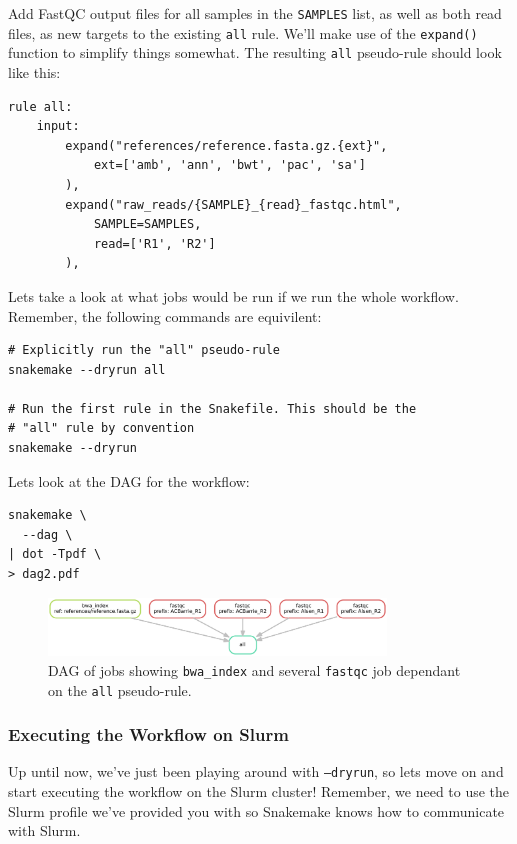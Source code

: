 Add FastQC output files for all samples in the \texttt{SAMPLES} list, as well as both read files, as new targets to the existing \texttt{all} rule. We'll make use of the \texttt{expand()}
function to simplify things somewhat. The resulting \texttt{all} pseudo-rule should look like this:

\begin{lstlisting}
rule all:
	input:
		expand("references/reference.fasta.gz.{ext}",
			ext=['amb', 'ann', 'bwt', 'pac', 'sa']
		),
		expand("raw_reads/{SAMPLE}_{read}_fastqc.html",
			SAMPLE=SAMPLES,
			read=['R1', 'R2']
		),
\end{lstlisting}

Lets take a look at what jobs would be run if we run the whole workflow. Remember, the following commands are equivilent:

\begin{lstlisting}
# Explicitly run the "all" pseudo-rule
snakemake --dryrun all

# Run the first rule in the Snakefile. This should be the
# "all" rule by convention
snakemake --dryrun
\end{lstlisting}

Lets look at the DAG for the workflow:

\begin{lstlisting}
snakemake \
  --dag \
| dot -Tpdf \
> dag2.pdf
\end{lstlisting}

\begin{figure}[H]
\centering
\includegraphics[width=0.8\textwidth]{handout/dag2.pdf}
\caption{DAG of jobs showing \texttt{bwa\_index} and several \texttt{fastqc} job dependant on the \texttt{all} pseudo-rule.}
\label{fig:dag2}
\end{figure}


\subsubsection{Executing the Workflow on Slurm}

Up until now, we've just been playing around with \texttt{--dryrun}, so lets move on and start executing the workflow on the Slurm cluster!
Remember, we need to use the Slurm profile we've provided you with so Snakemake knows how to communicate with Slurm.

